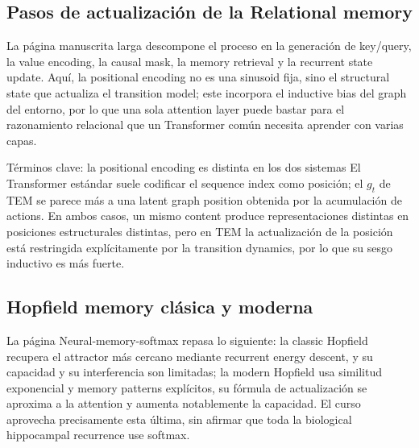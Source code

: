 \subsection{Pasos de actualización de la Relational memory}

La página manuscrita larga descompone el proceso en la generación de key/query, la value encoding, la causal mask, la memory retrieval y la recurrent state update. Aquí, la positional encoding no es una sinusoid fija, sino el structural state que actualiza el transition model; este incorpora el inductive bias del graph del entorno, por lo que una sola attention layer puede bastar para el razonamiento relacional que un Transformer común necesita aprender con varias capas.


\begin{knowledgebox}{Términos clave: la positional encoding es distinta en los dos sistemas}
El Transformer estándar suele codificar el sequence index como posición; el $g_t$ de TEM se parece más a una latent graph position obtenida por la acumulación de actions. En ambos casos, un mismo content produce representaciones distintas en posiciones estructurales distintas, pero en TEM la actualización de la posición está restringida explícitamente por la transition dynamics, por lo que su sesgo inductivo es más fuerte.
\end{knowledgebox}

\subsection{Hopfield memory clásica y moderna}

La página Neural-memory-softmax repasa lo siguiente: la classic Hopfield recupera el attractor más cercano mediante recurrent energy descent, y su capacidad y su interferencia son limitadas; la modern Hopfield usa similitud exponencial y memory patterns explícitos, su fórmula de actualización se aproxima a la attention y aumenta notablemente la capacidad. El curso aprovecha precisamente esta última, sin afirmar que toda la biological hippocampal recurrence use softmax.



